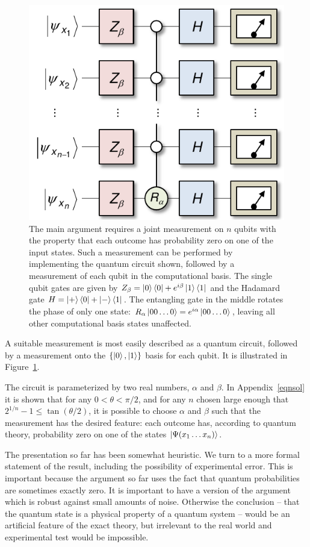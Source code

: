 \documentclass[amsmath,amssymb,superscriptaddress,pra,12pt]{revtex4-1}
\begin{document}
\begin{figure}
  \includegraphics[width=\columnwidth]{figs/nogofig3}
  \caption{The main argument requires a joint measurement on $n$ qubits with the property that each outcome has probability zero on one of the input states. Such a measurement can be performed by implementing the quantum circuit shown, followed by a measurement of each qubit in the computational basis. The single qubit gates are given by
$Z_\beta =\ket{0}\bra{0}+e^{i\beta}\ket{1}\bra{1}$
and the Hadamard gate
$H =\ket{+}\bra{0}+\ket{-}\bra{1}$.
The entangling gate in the middle rotates the phase of only one state:
$R_\alpha\ket{00\ldots0}= e^{i\alpha}\ket{00\ldots0}$, leaving all other computational basis states unaffected.}
  \label{fig3}
\end{figure}

A suitable measurement is most easily described as a quantum circuit, followed by a measurement onto the $\{\ket{0},\ket{1}\}$ basis for each qubit. It is illustrated in Figure~\ref{fig3}.

The circuit is parameterized by two real numbers, $\alpha$ and $\beta$. In Appendix~\ref{eqnsol} it is shown that for any $0<\theta<\pi/2$, and for any $n$ chosen large enough that  $2^{1/n} - 1 \leq \tan (\theta/2)$, it is possible to choose $\alpha$ and $\beta$ such that the measurement has the desired feature: each outcome has, according to quantum theory, probability zero on one of the states $\ket{\Psi(x_1\ldots x_n)}$.

The presentation so far has been somewhat heuristic. We turn to a more formal statement of the result, including the possibility of experimental error. This is important because the argument so far uses the fact that quantum probabilities are sometimes exactly zero. It is important to have a version of the argument which is robust against small amounts of noise. Otherwise the conclusion -- that the quantum state is a physical property of a quantum system -- would be an artificial feature of the exact theory, but irrelevant to the real world and experimental test would be impossible.
\end{document}
